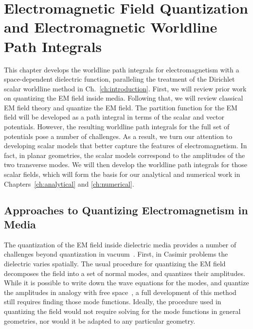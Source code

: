 \chapter{Electromagnetic Field Quantization and Electromagnetic Worldline Path Integrals}

\label{ch:EM_quantization}

This chapter develops the worldline path integrals for electromagnetism with a space-dependent
dielectric function, paralleling the treatment of the Dirichlet scalar worldline method in Ch.~\ref{ch:introduction}.  
First, we will review prior work on quantizing the EM field inside media.
Following that, we will review classical EM field theory and quantize the EM field.
The partition function for the EM field will be developed as a path integral in terms of the scalar and vector potentials.
However, the resulting worldline path integrals for the full set of potentials pose a number of challenges.
As a result, we turn our attention to developing scalar models that better capture the features
of electromagnetism.  In fact, in planar geometries, the scalar models correspond to 
the amplitudes of the two transverse modes.  
We will then develop the worldline path integrals for those scalar fields, which will form
the basis for our analytical and numerical work in Chapters~\ref{ch:analytical} and \ref{ch:numerical}.  

\section{Approaches to Quantizing Electromagnetism in Media}

The quantization of the EM field inside dielectric media provides a number of challenges 
beyond quantization in vacuum~\cite{Huttner1992,Dung1998,Bechler1999,Bordag1998,Rahi2009,Reid2013}.  
 First, in Casimir problems the dielectric varies spatially.  The usual procedure for
quantizing the EM field decomposes the field into a set of normal modes, and quantizes their amplitudes.
  While it is possible to write down the wave equations for the modes, and quantize the amplitudes
 in analogy with free space~\cite{Glauber1991}, a full development of this method still requires finding those mode functions.
 Ideally, the procedure used in quantizing the field would not require solving for the mode functions in
general geometries, nor would it be adapted to any particular geometry.   

